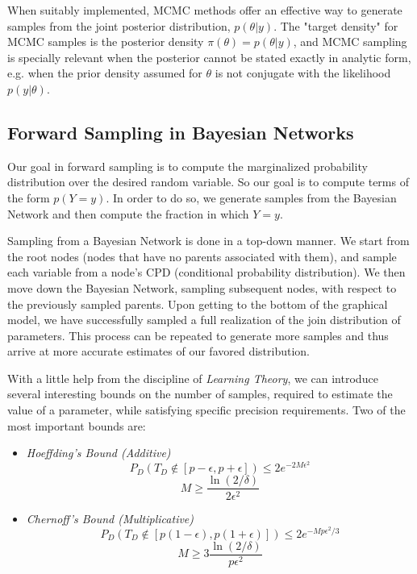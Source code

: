 \documentclass{article}
\begin{document}
When suitably implemented, MCMC methods offer an effective way to generate samples from the joint posterior distribution, $p(\theta|y)$. The "target density" for MCMC samples is the posterior density $\pi(\theta) = p(\theta|y)$, and MCMC sampling is specially relevant when the posterior cannot be stated exactly in analytic form, e.g. when the prior density assumed for $\theta$ is not conjugate with the likelihood $p(y|\theta)$.

\subsection{Forward Sampling in Bayesian Networks}
    Our goal in forward sampling is to compute the marginalized probability distribution over the desired random variable. So our goal is to compute terms of the form $p(Y=y)$. In order to do so, we generate samples from the Bayesian Network and then compute the fraction in which $Y=y$.
    
    Sampling from a Bayesian Network is done in a top-down manner. We start from the root nodes (nodes that have no parents associated with them), and sample each variable from a node's CPD (conditional probability distribution). We then move down the Bayesian Network, sampling subsequent nodes, with respect to the previously sampled parents. Upon getting to the bottom of the graphical model, we have successfully sampled a full realization of the join distribution of parameters. This process can be repeated to generate more samples and thus arrive at more accurate estimates of our favored distribution.

    With a little help from the discipline of \textit{Learning Theory}, we can introduce several interesting bounds on the number of samples, required to estimate the value of a parameter, while satisfying specific precision requirements. Two of the most important bounds are:
    
    \begin{itemize}
        \item \textit{Hoeffding's Bound (Additive)}
            \begin{equation}
                P_D (T_D \notin [p-\epsilon, p+\epsilon]) \leq 2e^{-2M\epsilon^2}                
            \end{equation}
            \begin{equation}
                M \geq \frac{\ln(2/\delta)}{2\epsilon^2}  
            \end{equation}
        \item \textit{Chernoff's Bound (Multiplicative)}
            \begin{equation}
                P_D (T_D \notin [p(1-\epsilon), p(1+\epsilon)]) \leq 2e^{-Mp\epsilon^2/3}                                        
            \end{equation}
            \begin{equation}
                M \geq 3\frac{\ln(2/\delta)}{p\epsilon^2}                  
            \end{equation}            
    \end{itemize}
    
\end{document}
